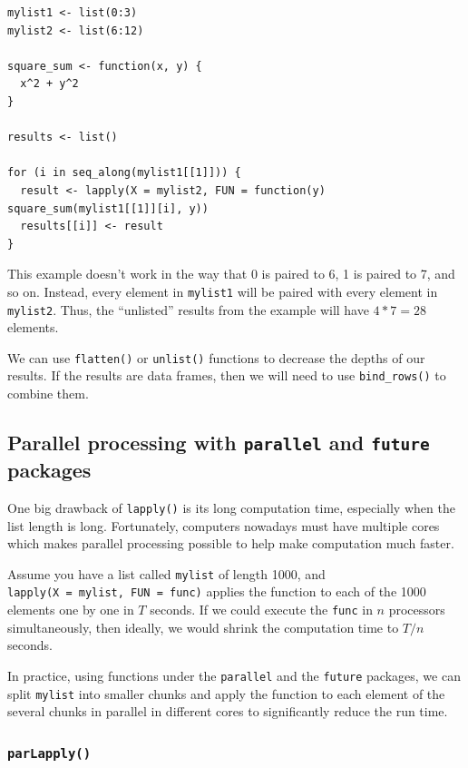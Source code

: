 \documentclass[
]{book}
\begin{document}
\begin{verbatim}
mylist1 <- list(0:3)
mylist2 <- list(6:12)

square_sum <- function(x, y) {
  x^2 + y^2
}

results <- list()

for (i in seq_along(mylist1[[1]])) {
  result <- lapply(X = mylist2, FUN = function(y) square_sum(mylist1[[1]][i], y))
  results[[i]] <- result
}
\end{verbatim}

This example doesn't work in the way that 0 is paired to 6, 1 is paired to 7, and so on. Instead, every element in \texttt{mylist1} will be paired with every element in \texttt{mylist2}. Thus, the ``unlisted'' results from the example will have \(4*7 = 28\) elements.

We can use \texttt{flatten()} or \texttt{unlist()} functions to decrease the depths of our results. If the results are data frames, then we will need to use \texttt{bind\_rows()} to combine them.

\subsection{\texorpdfstring{Parallel processing with \texttt{parallel} and \texttt{future} packages}{Parallel processing with parallel and future packages}}\label{parallel-processing-with-parallel-and-future-packages}

One big drawback of \texttt{lapply()} is its long computation time, especially when the list length is long. Fortunately, computers nowadays must have multiple cores which makes parallel processing possible to help make computation much faster.

Assume you have a list called \texttt{mylist} of length 1000, and \texttt{lapply(X\ =\ mylist,\ FUN\ =\ func)} applies the function to each of the 1000 elements one by one in \(T\) seconds. If we could execute the \texttt{func} in \(n\) processors simultaneously, then ideally, we would shrink the computation time to \(T/n\) seconds.

In practice, using functions under the \texttt{parallel} and the \texttt{future} packages, we can split \texttt{mylist} into smaller chunks and apply the function to each element of the several chunks in parallel in different cores to significantly reduce the run time.

\subsubsection{\texorpdfstring{\texttt{parLapply()}}{parLapply()}}\label{parlapply}
\end{document}
